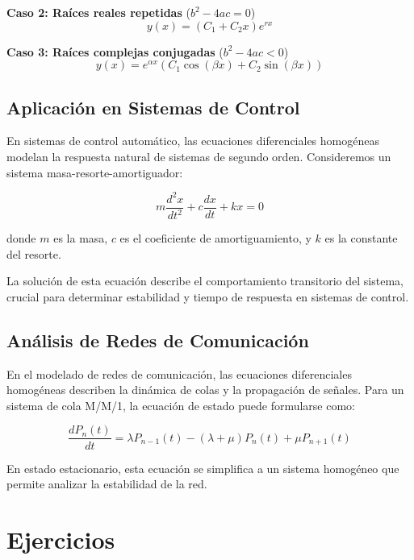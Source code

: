 \documentclass[12pt]{article}
\begin{document}
\textbf{Caso 2: Raíces reales repetidas} ($b^2 - 4ac = 0$)
\begin{equation}
    y(x) = (C_1 + C_2 x) e^{rx}
\end{equation}

\textbf{Caso 3: Raíces complejas conjugadas} ($b^2 - 4ac < 0$)
\begin{equation}
    y(x) = e^{\alpha x} (C_1 \cos(\beta x) + C_2 \sin(\beta x))
\end{equation}

\subsection{Aplicación en Sistemas de Control}

En sistemas de control automático, las ecuaciones diferenciales homogéneas modelan la respuesta natural de sistemas de segundo orden. Consideremos un sistema masa-resorte-amortiguador:

\begin{equation}
    m \frac{d^2 x}{dt^2} + c \frac{dx}{dt} + kx = 0
\end{equation}

donde $m$ es la masa, $c$ es el coeficiente de amortiguamiento, y $k$ es la constante del resorte.

La solución de esta ecuación describe el comportamiento transitorio del sistema, crucial para determinar estabilidad y tiempo de respuesta en sistemas de control.

\subsection{Análisis de Redes de Comunicación}

En el modelado de redes de comunicación, las ecuaciones diferenciales homogéneas describen la dinámica de colas y la propagación de señales. Para un sistema de cola M/M/1, la ecuación de estado puede formularse como:

\begin{equation}
    \frac{dP_n(t)}{dt} = \lambda P_{n-1}(t) - (\lambda + \mu) P_n(t) + \mu P_{n+1}(t)
\end{equation}

En estado estacionario, esta ecuación se simplifica a un sistema homogéneo que permite analizar la estabilidad de la red.

\section{Ejercicios}
\end{document}
